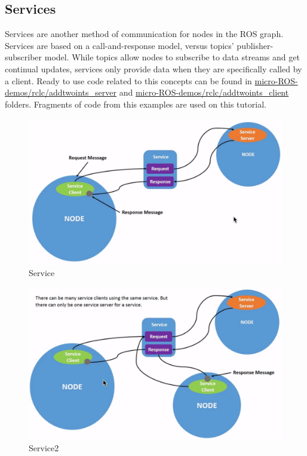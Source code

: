 \subsection{Services}
Services are another method of communication for nodes in the ROS graph. Services are based on a call-and-response model, versus topics’ publisher-subscriber model. While topics allow nodes to subscribe to data streams and get continual updates, services only provide data when they are specifically called by a client. Ready to use code related to this concepts can be found in \href{https://github.com/micro-ROS/micro-ROS-demos/blob/foxy/rclc/addtwoints_server/main.c}{micro-ROS-demos/rclc/addtwoints\_server} and \href{https://github.com/micro-ROS/micro-ROS-demos/blob/foxy/rclc/addtwoints_client/main.c}{micro-ROS-demos/rclc/addtwoints\_client} folders. Fragments of code from this examples are used on this tutorial.
\begin{figure}[htb!]
    \centering
    \includegraphics[width=0.75\linewidth]{Img/service1.jpg}
    \caption{Service}
    \vspace{-0.1in}
\end{figure}
\begin{figure}[htb!]
    \centering
    \includegraphics[width=0.75\linewidth]{Img/service2.jpg}
    \caption{Service2}
    \vspace{-0.1in}
\end{figure}

